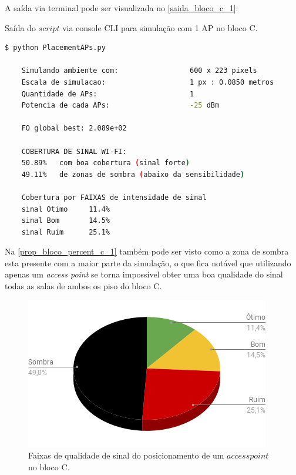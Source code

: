 \documentclass[
	12pt,				%
	twoside,			%
	a4paper,			%
	english,			%
	french,				%
	spanish,			%
	brazil				%
	]{abntex2}
\begin{document}
A saída via terminal pode ser visualizada no \autoref{saida_bloco_c_1}:

\begin{quadro}[!htb]
    \caption{\label{saida_bloco_c_1} Saída do $script$ via console CLI para simulação com 1 AP no bloco C. }

    \begin{lstlisting}[language=bash]
    $ python PlacementAPs.py 
    
    Simulando ambiente com:                 600 x 223 pixels
    Escala de simulacao:                    1 px : 0.0850 metros
    Quantidade de APs:                      1
    Potencia de cada APs:                   -25 dBm
    
    FO global best: 2.089e+02
    
    COBERTURA DE SINAL WI-FI:
    50.89%   com boa cobertura (sinal forte)
    49.11%   de zonas de sombra (abaixo da sensibilidade)
    
    Cobertura por FAIXAS de intensidade de sinal
    sinal Otimo     11.4%
    sinal Bom       14.5%
    sinal Ruim      25.1%

\end{lstlisting}

\end{quadro}

Na \autoref{prop_bloco_percent_c_1} também pode ser visto como a zona de
sombra esta presente com a maior parte da simulação, o que fica notável
que utilizando apenas um \emph{access point} se torna impossível obter
uma boa qualidade do sinal todas as salas de ambos os piso do bloco C.

\begin{figure}[ht]
    \caption{\label{prop_bloco_percent_c_1} Faixas de qualidade de sinal do posicionamento
     de um $access point$ no bloco C.}
    \begin{center}
        \includegraphics[scale=0.7]{imagens/prop-bloco-percent-c-1.png}
    \end{center}
\end{figure}
\end{document}
